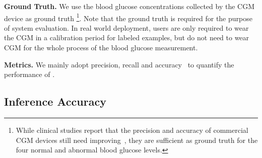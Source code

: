 \textbf{Ground Truth.}
We use the blood glucose concentrations collected by the CGM device as ground truth \footnote{While clinical studies report that the precision and accuracy of commercial CGM devices still need improving~\cite{bib:MEP08:Do, bib:JDST10:Vaddiraju}, they are sufficient as ground truth for the four normal and abnormal blood glucose levels.}. Note that the ground truth is required for the purpose of system evaluation. \textcolor[rgb]{1.00,0.00,0.00}{In real world deployment, users are only required to wear the CGM in a calibration period for labeled examples, but do not need to wear CGM for the whole process of the blood glucose measurement.}

\textbf{Metrics.}
We mainly adopt precision, recall and accuracy~\cite{prf1} to quantify the performance of \sysname.
%
%


\subsection{Inference Accuracy}
